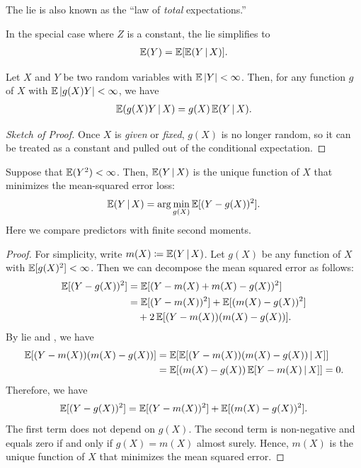 \documentclass[a4paper,12pt]{article}
\begin{document}
\begin{remark}
	The	\gls{lie} is also known as the ``law of \emph{total} expectations.''
\end{remark}

\begin{remark}
	In the special case where $Z$ is a constant,
	the \gls{lie} simplifies to
	\begin{align}
		\operatorname{\mathbb{E}}(Y)=\operatorname{\mathbb{E}}[\operatorname{\mathbb{E}}(Y\mathpunct{}|\mathpunct{} X)].
	\end{align}
\end{remark}

\begin{theorem}\label{thm-conditioning}
	Let $X$ and $Y$ be two random variables with $\operatorname{\mathbb{E}}|Y|<\infty$.
	Then, for any function $g$ of $X$ with $\operatorname{\mathbb{E}}|g(X)Y|<\infty$, we have
	\begin{align}
		\operatorname{\mathbb{E}}(g(X)Y\mathpunct{}|\mathpunct{} X) = g(X)\operatorname{\mathbb{E}}(Y\mathpunct{}|\mathpunct{} X).
	\end{align}
\end{theorem}
\begin{proof}[Sketch of Proof]
	Once $X$ is \emph{given} or \emph{fixed}, $g(X)$ is no longer random,
	so it can be treated as a constant and pulled out of the conditional expectation.
\end{proof}

\begin{theorem}\label{thm-cond-exp-char}
	Suppose that $\operatorname{\mathbb{E}}(Y^2)<\infty$.
	Then, $\operatorname{\mathbb{E}}(Y\mathpunct{}|\mathpunct{} X)$ is the unique function of $X$ that minimizes the mean-squared error loss:
	\begin{align}
		\operatorname{\mathbb{E}}(Y\mathpunct{}|\mathpunct{} X)
		= \arg\min_{g(X)} \operatorname{\mathbb{E}}[(Y - g(X))^2].
	\end{align}
	Here we compare predictors with finite second moments.
\end{theorem}
\begin{proof}
	For simplicity, write $m(X)\coloneqq\operatorname{\mathbb{E}}(Y\mathpunct{}|\mathpunct{} X)$.
	Let $g(X)$ be any function of $X$ with $\operatorname{\mathbb{E}}[g(X)^2]<\infty$.
	Then we can decompose the mean squared error as follows:
	\begin{align*}
		\operatorname{\mathbb{E}}[(Y - g(X))^2]
		&= \operatorname{\mathbb{E}}[(Y - m(X) + m(X) - g(X))^2] \\
		&= \operatorname{\mathbb{E}}[(Y - m(X))^2] + \operatorname{\mathbb{E}}[(m(X) - g(X))^2] \\
		&\quad+ 2\operatorname{\mathbb{E}}[(Y - m(X))(m(X) - g(X))].
	\end{align*}
	By \gls{lie} and , we have
	\begin{align*}
		\operatorname{\mathbb{E}}[(Y - m(X))(m(X) - g(X))]
		&= \operatorname{\mathbb{E}}[\operatorname{\mathbb{E}}[(Y - m(X))(m(X) - g(X))\mathpunct{}|\mathpunct{} X]] \\
		&= \operatorname{\mathbb{E}}[(m(X) - g(X))\operatorname{\mathbb{E}}[Y - m(X)\mathpunct{}|\mathpunct{} X]] = 0.
	\end{align*}
	Therefore, we have
	\begin{align}
		\operatorname{\mathbb{E}}[(Y - g(X))^2] = \operatorname{\mathbb{E}}[(Y - m(X))^2] + \operatorname{\mathbb{E}}[(m(X) - g(X))^2].
	\end{align}
	The first term does not depend on $g(X)$.
	The second term is non-negative and equals zero if and only if $g(X) = m(X)$ almost surely.
	Hence, $m(X)$ is the unique function of $X$ that minimizes the mean squared error.
\end{proof}
\end{document}
